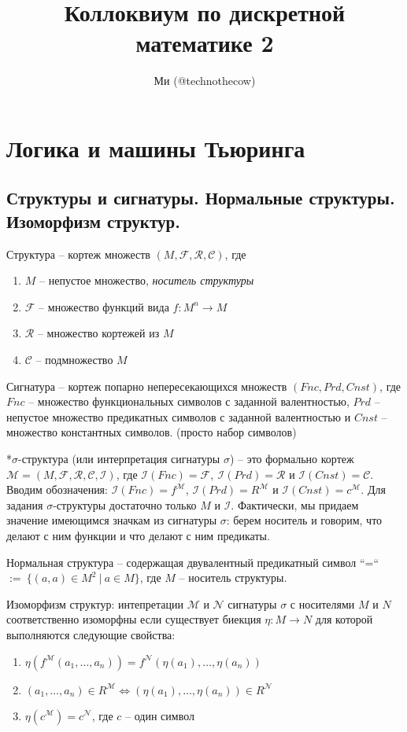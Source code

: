 \documentclass[a4paper, 10pt]{article}
\title{Коллоквиум по дискретной математике 2}
\date{}
\author{Ми (@technothecow)}
\newcommand{\FF}{\mathcal{F}}
\newcommand{\RR}{\mathcal{R}}
\newcommand{\CC}{\mathcal{C}}
\newcommand{\MM}{\mathcal{M}}
\newcommand{\II}{\mathcal{I}}
\newcommand{\NN}{\mathcal{N}}
\begin{document}
\maketitle

\tableofcontents

\newpage

\section{Логика и машины Тьюринга}

\subsection{Структуры и сигнатуры. Нормальные структуры. Изоморфизм структур.}

Структура -- кортеж множеств $(M, \FF, \RR, \CC)$, где 
\begin{enumerate}
    \item $M$ -- непустое множество, \textit{носитель структуры}
    \item $\FF$ -- множество функций вида $f\colon M^n\to M$
    \item $\RR$ -- множество кортежей из $M$
    \item $\CC$ -- подмножество $M$
\end{enumerate}

Сигнатура -- кортеж попарно непересекающихся множеств $(Fnc,Prd,Cnst)$, где $Fnc$ -- множество функциональных символов с заданной валентностью, $Prd$ -- непустое множество предикатных символов с заданной валентностью и $Cnst$ -- множество константных символов. (просто набор символов)

*$\sigma$-структура (или интерпретация сигнатуры $\sigma$) -- это формально кортеж $\MM = (M,\FF,\RR,\CC,\II)$, где $\II(Fnc)=\FF,~\II(Prd)=\RR$ и $\II(Cnst)=\CC$. Вводим обозначения: $\II(Fnc)=f^\MM$, $\II(Prd)=R^\MM$ и $\II(Cnst)=c^\MM$. Для задания $\sigma$-структуры достаточно только $M$ и $\II$. Фактически, мы придаем значение имеющимся значкам из сигнатуры $\sigma$: берем носитель и говорим, что делают с ним функции и что делают с ним предикаты.

Нормальная структура -- содержащая двувалентный предикатный символ ``=`` $:=~\{(a, a) \in M^2~|~a \in M\}$, где $M$ -- носитель структуры.


Изоморфизм структур: интепретации $\MM$ и $\NN$ сигнатуры $\sigma$ с носителями $M$ и $N$ соответственно изоморфны если существует биекция $\eta \colon M \to N$ для которой выполняются следующие свойства:
\begin{enumerate}
    \item $\eta(f^\MM(a_1,\ldots,a_n))=f^\NN(\eta(a_1),\ldots,\eta(a_n))$
    \item $(a_1,\ldots,a_n)\in R^\MM \iff (\eta(a_1),\ldots,\eta(a_n))\in R^\NN$
    \item $\eta(c^\MM) = c^\NN$, где $c$ -- один символ
\end{enumerate}
\end{document}
